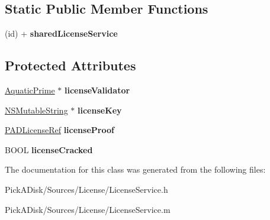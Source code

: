\subsection*{Static Public Member Functions}
\begin{DoxyCompactItemize}
\item 
\hypertarget{interface_p_a_d_license_service_a279aa2fe837627b2ce0d2d055356d5e4}{
(id) + {\bfseries sharedLicenseService}}
\label{interface_p_a_d_license_service_a279aa2fe837627b2ce0d2d055356d5e4}

\end{DoxyCompactItemize}
\subsection*{Protected Attributes}
\begin{DoxyCompactItemize}
\item 
\hypertarget{interface_p_a_d_license_service_a5d843f8196a910c0dd47f5ef92512bf0}{
\hyperlink{interface_aquatic_prime}{AquaticPrime} $\ast$ {\bfseries licenseValidator}}
\label{interface_p_a_d_license_service_a5d843f8196a910c0dd47f5ef92512bf0}

\item 
\hypertarget{interface_p_a_d_license_service_a8e89a7ebf643e57186932f6578c4e1db}{
\hyperlink{class_n_s_mutable_string}{NSMutableString} $\ast$ {\bfseries licenseKey}}
\label{interface_p_a_d_license_service_a8e89a7ebf643e57186932f6578c4e1db}

\item 
\hypertarget{interface_p_a_d_license_service_a59d6e729a81d9c859a28cc381fd59c7c}{
\hyperlink{interface_p_a_d_license}{PADLicenseRef} {\bfseries licenseProof}}
\label{interface_p_a_d_license_service_a59d6e729a81d9c859a28cc381fd59c7c}

\item 
\hypertarget{interface_p_a_d_license_service_a5d9451cdf85b3e9b5ba6af31ad757cba}{
BOOL {\bfseries licenseCracked}}
\label{interface_p_a_d_license_service_a5d9451cdf85b3e9b5ba6af31ad757cba}

\end{DoxyCompactItemize}


The documentation for this class was generated from the following files:\begin{DoxyCompactItemize}
\item 
PickADisk/Sources/License/LicenseService.h\item 
PickADisk/Sources/License/LicenseService.m\end{DoxyCompactItemize}
